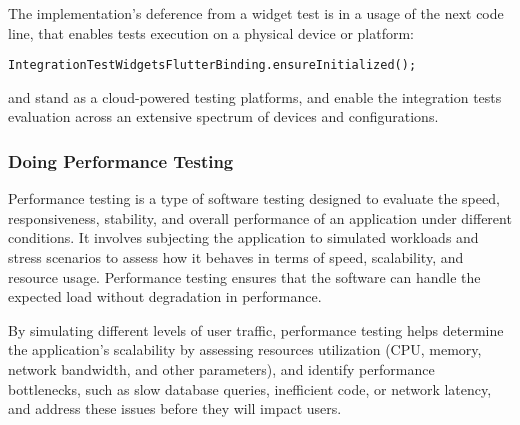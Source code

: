 \noindent The implementation's deference from a widget test is in a usage of the next code line, that enables tests 
execution on a physical device or platform:
\begin{lstlisting}
IntegrationTestWidgetsFlutterBinding.ensureInitialized();
\end{lstlisting}

 and  stand as a cloud-powered testing platforms, and enable the integration tests
evaluation across an extensive spectrum of devices and configurations.


\subsubsection{Doing Performance Testing}

Performance testing is a type of software testing designed to evaluate the speed, responsiveness, stability, and 
overall performance of an application under different conditions. It involves subjecting the application to 
simulated workloads and stress scenarios to assess how it behaves in terms of speed, scalability, and resource usage. 
Performance testing ensures that the software can handle the expected load without degradation in performance.

By simulating different levels of user traffic, performance testing helps determine the application's scalability by
assessing resources utilization (CPU, memory, network bandwidth, and other parameters), and identify performance 
bottlenecks, such as slow database queries, inefficient code, or network latency, and address these issues before 
they will impact users.

